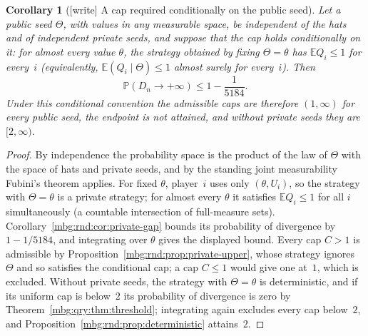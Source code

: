 \documentclass[11pt,letterpaper]{article}
\newtheorem{corollary}[theorem]{Corollary}
\theoremstyle{definition}
\newcommand{\E}{\mathbb E}
\newcommand{\Prb}{\mathbb P}
\begin{document}
\begin{corollary}[{[write]} A cap required conditionally on the public seed]
\label{mbg:rnd:cor:conditional}
Let a public seed $\Theta$, with values in any measurable space, be independent of the hats and of independent private seeds, and suppose that the cap holds conditionally on it: for almost every value $\theta$, the strategy obtained by fixing $\Theta=\theta$ has $\E Q_i\le1$ for every~$i$ (equivalently, $\E(Q_i\mid\Theta)\le1$ almost surely for every~$i$). Then
\[
 \Prb(D_n\to+\infty)\le1-\frac1{5184}.
\]
Under this conditional convention the admissible caps are therefore $(1,\infty)$ for every public seed, the endpoint is not attained, and without private seeds they are $[2,\infty)$.
\end{corollary}
\begin{proof}
By independence the probability space is the product of the law of $\Theta$ with the space of hats and private seeds, and by the standing joint measurability Fubini's theorem applies. For fixed $\theta$, player~$i$ uses only $(\theta,U_i)$, so the strategy with $\Theta=\theta$ is a private strategy; for almost every $\theta$ it satisfies $\E Q_i\le1$ for all $i$ simultaneously (a countable intersection of full-measure sets). Corollary~\ref{mbg:rnd:cor:private-gap} bounds its probability of divergence by $1-1/5184$, and integrating over $\theta$ gives the displayed bound. Every cap $C>1$ is admissible by Proposition~\ref{mbg:rnd:prop:private-upper}, whose strategy ignores $\Theta$ and so satisfies the conditional cap; a cap $C\le1$ would give one at~$1$, which is excluded. Without private seeds, the strategy with $\Theta=\theta$ is deterministic, and if its uniform cap is below~$2$ its probability of divergence is zero by Theorem~\ref{mbg:qry:thm:threshold}; integrating again excludes every cap below~$2$, and Proposition~\ref{mbg:rnd:prop:deterministic} attains~$2$.
\end{proof}
\end{document}
